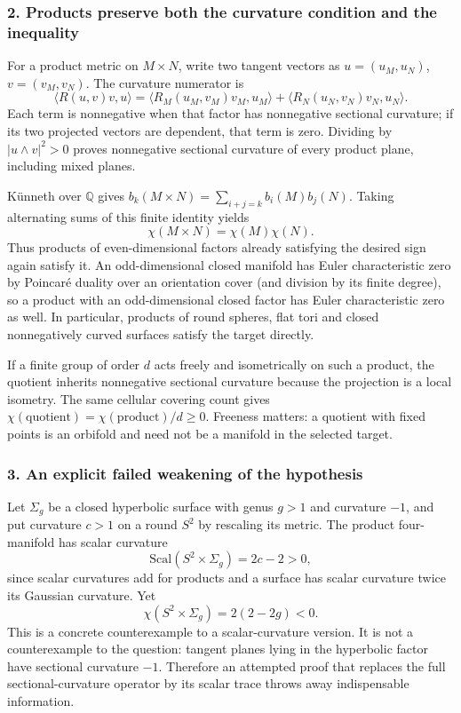 \documentclass[11pt]{article}
\begin{document}
\subsubsection{2. Products preserve both the curvature condition and the inequality}
For a product metric on $M\times N$, write two tangent vectors as $u=(u_M,u_N)$, $v=(v_M,v_N)$. The curvature numerator is
\[\langle R(u,v)v,u\rangle
=\langle R_M(u_M,v_M)v_M,u_M\rangle+
\langle R_N(u_N,v_N)v_N,u_N\rangle.\]
Each term is nonnegative when that factor has nonnegative sectional curvature; if its two projected vectors are dependent, that term is zero. Dividing by $|u\wedge v|^2>0$ proves nonnegative sectional curvature of every product plane, including mixed planes.

K\"unneth over $\mathbb Q$ gives $b_k(M\times N)=\sum_{i+j=k}b_i(M)b_j(N)$. Taking alternating sums of this finite identity yields
\[\chi(M\times N)=\chi(M)\chi(N).\]
Thus products of even-dimensional factors already satisfying the desired sign again satisfy it. An odd-dimensional closed manifold has Euler characteristic zero by Poincar\'e duality over an orientation cover (and division by its finite degree), so a product with an odd-dimensional closed factor has Euler characteristic zero as well. In particular, products of round spheres, flat tori and closed nonnegatively curved surfaces satisfy the target directly.

If a finite group of order $d$ acts freely and isometrically on such a product, the quotient inherits nonnegative sectional curvature because the projection is a local isometry. The same cellular covering count gives $\chi(\text{quotient})=\chi(\text{product})/d\ge0$. Freeness matters: a quotient with fixed points is an orbifold and need not be a manifold in the selected target.

\subsubsection{3. An explicit failed weakening of the hypothesis}
Let $\Sigma_g$ be a closed hyperbolic surface with genus $g>1$ and curvature $-1$, and put curvature $c>1$ on a round $S^2$ by rescaling its metric. The product four-manifold has scalar curvature
\[\mathrm{Scal}(S^2\times\Sigma_g)=2c-2>0,\]
since scalar curvatures add for products and a surface has scalar curvature twice its Gaussian curvature. Yet
\[\chi(S^2\times\Sigma_g)=2(2-2g)<0.\]
This is a concrete counterexample to a scalar-curvature version. It is not a counterexample to the question: tangent planes lying in the hyperbolic factor have sectional curvature $-1$. Therefore an attempted proof that replaces the full sectional-curvature operator by its scalar trace throws away indispensable information.
\end{document}
